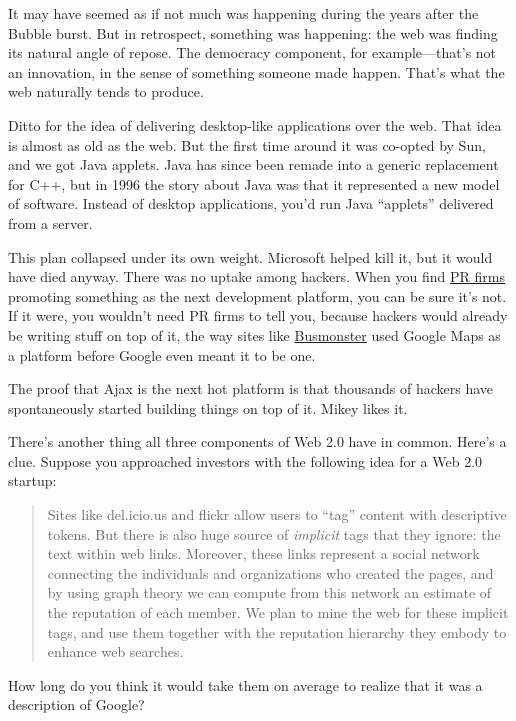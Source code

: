 It may have seemed as if not much was happening during the years after
the Bubble burst. But in retrospect, something was happening: the web
was finding its natural angle of repose. The democracy component, for
example---that's not an innovation, in the sense of something someone
made happen. That's what the web naturally tends to produce.

Ditto for the idea of delivering desktop-like applications over the web.
That idea is almost as old as the web. But the first time around it was
co-opted by Sun, and we got Java applets. Java has since been remade
into a generic replacement for C++, but in 1996 the story about Java was
that it represented a new model of software. Instead of desktop
applications, you'd run Java ``applets'' delivered from a server.

This plan collapsed under its own weight. Microsoft helped kill it, but
it would have died anyway. There was no uptake among hackers. When you
find \href{submarine.html}{PR firms} promoting something as the next
development platform, you can be sure it's not. If it were, you wouldn't
need PR firms to tell you, because hackers would already be writing
stuff on top of it, the way sites like
\href{http://busmonster.com}{Busmonster} used Google Maps as a platform
before Google even meant it to be one.

The proof that Ajax is the next hot platform is that thousands of
hackers have spontaneously started building things on top of it. Mikey
likes it.

There's another thing all three components of Web 2.0 have in common.
Here's a clue. Suppose you approached investors with the following idea
for a Web 2.0 startup:

\begin{quote}
Sites like del.icio.us and flickr allow users to ``tag'' content with
descriptive tokens. But there is also huge source of \emph{implicit}
tags that they ignore: the text within web links. Moreover, these links
represent a social network connecting the individuals and organizations
who created the pages, and by using graph theory we can compute from
this network an estimate of the reputation of each member. We plan to
mine the web for these implicit tags, and use them together with the
reputation hierarchy they embody to enhance web searches.
\end{quote}

How long do you think it would take them on average to realize that it
was a description of Google?

